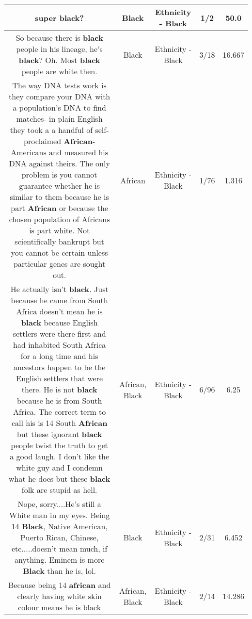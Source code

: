 \documentclass[11pt]{article}
\newlength\mylength
\begin{document}
\begin{center}
\begin{longtable}{|C{.65\mylength}|C{.30\mylength}|C{.12\mylength}|C{.12\mylength}|C{.12\mylength}|}
  \small super \textbf{black}?\normalsize   & Black & Ethnicity - Black & 1/2 & 50.0 \\  \hline
  \small So because there is \textbf{black} people in his lineage, he's \textbf{black}? Oh. Most \textbf{black} people are white then.\normalsize   & Black & Ethnicity - Black & 3/18 & 16.667 \\  \hline
  \small The way DNA tests work is they compare your DNA with a population's DNA to find matches- in plain English they took a a handful of self-proclaimed \textbf{African}-Americans and measured his DNA against theirs. The only problem is you cannot guarantee whether he is similar to them because he is part \textbf{African} or because the chosen population of Africans is part white. Not scientifically bankrupt but you cannot be certain unless particular genes are sought out.\normalsize   & African & Ethnicity - Black & 1/76 & 1.316 \\  \hline
  \small He actually isn't \textbf{black}. Just because he came from South Africa doesn't mean he is \textbf{black} because English settlers were there first and had inhabited South Africa for a long time and his ancestors happen to be the English settlers that were there. He is not \textbf{black} because he is from South Africa. The correct term to call his is 14 South \textbf{African} but these ignorant \textbf{black} people twist the truth to get a good laugh. I don't like the white guy and I condemn what he does but these \textbf{black} folk are stupid as hell.\normalsize   & African, Black & Ethnicity - Black & 6/96 & 6.25 \\  \hline
  \small Nope, sorry....He's still a White man in my eyes. Being 14 \textbf{Black}, Native American, Puerto Rican, Chinese, etc.....doesn't mean much, if anything. Eminem is more \textbf{Black} than he is, lol.\normalsize   & Black & Ethnicity - Black & 2/31 & 6.452 \\  \hline
  \small Because being 14 \textbf{african} and clearly having white skin colour means he is black\normalsize   & African, Black & Ethnicity - Black & 2/14 & 14.286 \\  \hline

\end{longtable}
\end{center}
\end{document}
